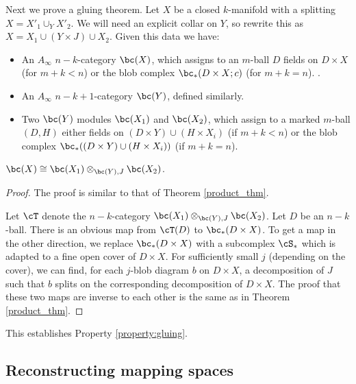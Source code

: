 Next we prove a gluing theorem.
Let $X$ be a closed $k$-manifold with a splitting $X = X'_1\cup_Y X'_2$.
We will need an explicit collar on $Y$, so rewrite this as
$X = X_1\cup (Y\times J) \cup X_2$.
Given this data we have: 
\begin{itemize}
\item An $A_\infty$ $n{-}k$-category $\bc(X)$, which assigns to an $m$-ball
$D$ fields on $D\times X$ (for $m+k < n$) or the blob complex $\bc_*(D\times X; c)$
(for $m+k = n$). .
\item An $A_\infty$ $n{-}k{+}1$-category $\bc(Y)$, defined similarly.
\item Two $\bc(Y)$ modules $\bc(X_1)$ and $\bc(X_2)$, which assign to a marked
$m$-ball $(D, H)$ either fields on $(D\times Y) \cup (H\times X_i)$ (if $m+k < n$)
or the blob complex $\bc_*((D\times Y) \cup (H\times X_i))$ (if $m+k = n$).
\end{itemize}

\begin{thm}
\label{thm:gluing}
$\bc(X) \cong \bc(X_1) \otimes_{\bc(Y), J} \bc(X_2)$.
\end{thm}

\begin{proof}
The proof is similar to that of Theorem \ref{product_thm}.

Let $\cT$ denote the $n{-}k$-category $\bc(X_1) \otimes_{\bc(Y), J} \bc(X_2)$.
Let $D$ be an $n{-}k$-ball.
There is an obvious map from $\cT(D)$ to $\bc_*(D\times X)$.
To get a map in the other direction, we replace $\bc_*(D\times X)$ with a subcomplex
$\cS_*$ which is adapted to a fine open cover of $D\times X$.
For sufficiently small $j$ (depending on the cover), we can find, for each $j$-blob diagram $b$
on $D\times X$, a decomposition of $J$ such that $b$ splits on the corresponding
decomposition of $D\times X$.
The proof that these two maps are inverse to each other is the same as in
Theorem \ref{product_thm}.
\end{proof}

This establishes Property \ref{property:gluing}.

\medskip

\subsection{Reconstructing mapping spaces}

